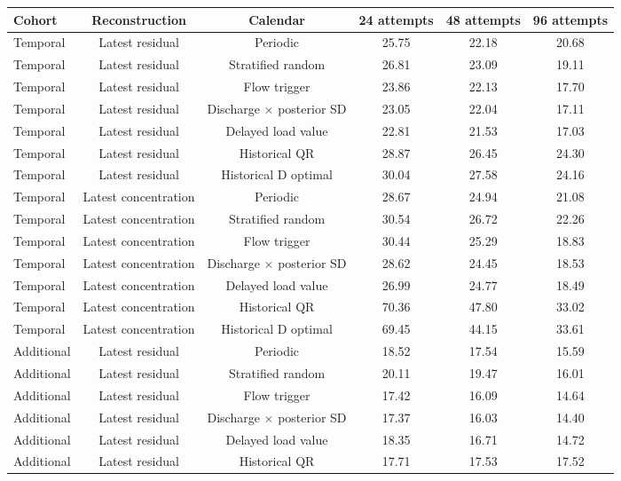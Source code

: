 \documentclass[lineno,pdflatex,sn-apa]{sn-jnl}%
\theoremstyle{thmstyleone}%
\theoremstyle{thmstyletwo}%
\theoremstyle{thmstylethree}%
\begin{document}
\begin{center}
\footnotesize
\setlength{\tabcolsep}{2pt}
\begin{tabular}{@{}lccccc@{}}
\toprule
Cohort & Reconstruction & Calendar & 24 attempts & 48 attempts & 96 attempts\\
\midrule
Temporal & Latest residual & Periodic & 25.75 & 22.18 & 20.68\\
Temporal & Latest residual & Stratified random & 26.81 & 23.09 & 19.11\\
Temporal & Latest residual & Flow trigger & 23.86 & 22.13 & 17.70\\
Temporal & Latest residual & Discharge $\times$ posterior SD & 23.05 & 22.04 & 17.11\\
Temporal & Latest residual & Delayed load value & 22.81 & 21.53 & 17.03\\
Temporal & Latest residual & Historical QR & 28.87 & 26.45 & 24.30\\
Temporal & Latest residual & Historical D optimal & 30.04 & 27.58 & 24.16\\
Temporal & Latest concentration & Periodic & 28.67 & 24.94 & 21.08\\
Temporal & Latest concentration & Stratified random & 30.54 & 26.72 & 22.26\\
Temporal & Latest concentration & Flow trigger & 30.44 & 25.29 & 18.83\\
Temporal & Latest concentration & Discharge $\times$ posterior SD & 28.62 & 24.45 & 18.53\\
Temporal & Latest concentration & Delayed load value & 26.99 & 24.77 & 18.49\\
Temporal & Latest concentration & Historical QR & 70.36 & 47.80 & 33.02\\
Temporal & Latest concentration & Historical D optimal & 69.45 & 44.15 & 33.61\\
Additional & Latest residual & Periodic & 18.52 & 17.54 & 15.59\\
Additional & Latest residual & Stratified random & 20.11 & 19.47 & 16.01\\
Additional & Latest residual & Flow trigger & 17.42 & 16.09 & 14.64\\
Additional & Latest residual & Discharge $\times$ posterior SD & 17.37 & 16.03 & 14.40\\
Additional & Latest residual & Delayed load value & 18.35 & 16.71 & 14.72\\
Additional & Latest residual & Historical QR & 17.71 & 17.53 & 17.52\\

\end{tabular}
\end{center}
\end{document}
